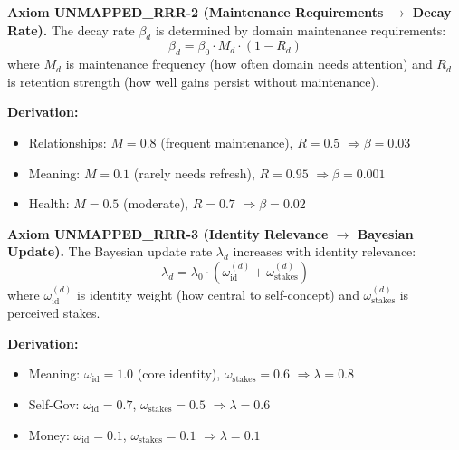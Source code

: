 \begin{tcolorbox}[colback=red!5!white, colframe=red!75!black, title=Axiom UNMAPPED_RRR-2: Maintenance Requirements]
\textbf{Axiom UNMAPPED_RRR-2 (Maintenance Requirements $\rightarrow$ Decay Rate).}
The decay rate $\beta_d$ is determined by domain maintenance requirements:
\begin{equation}
\beta_d = \beta_0 \cdot M_d \cdot (1 - R_d)
\end{equation}
where $M_d$ is maintenance frequency (how often domain needs attention)
and $R_d$ is retention strength (how well gains persist without maintenance).

\textbf{Derivation:}
\begin{itemize}[nosep]
\item Relationships: $M = 0.8$ (frequent maintenance), $R = 0.5$ $\Rightarrow \beta = 0.03$
\item Meaning: $M = 0.1$ (rarely needs refresh), $R = 0.95$ $\Rightarrow \beta = 0.001$
\item Health: $M = 0.5$ (moderate), $R = 0.7$ $\Rightarrow \beta = 0.02$
\end{itemize}
\end{tcolorbox}

\begin{tcolorbox}[colback=red!5!white, colframe=red!75!black, title=Axiom UNMAPPED_RRR-3: Identity Relevance]
\textbf{Axiom UNMAPPED_RRR-3 (Identity Relevance $\rightarrow$ Bayesian Update).}
The Bayesian update rate $\lambda_d$ increases with identity relevance:
\begin{equation}
\lambda_d = \lambda_0 \cdot \left( \omega_{\text{id}}^{(d)} + \omega_{\text{stakes}}^{(d)} \right)
\end{equation}
where $\omega_{\text{id}}^{(d)}$ is identity weight (how central to self-concept)
and $\omega_{\text{stakes}}^{(d)}$ is perceived stakes.

\textbf{Derivation:}
\begin{itemize}[nosep]
\item Meaning: $\omega_{\text{id}} = 1.0$ (core identity), $\omega_{\text{stakes}} = 0.6$ $\Rightarrow \lambda = 0.8$
\item Self-Gov: $\omega_{\text{id}} = 0.7$, $\omega_{\text{stakes}} = 0.5$ $\Rightarrow \lambda = 0.6$
\item Money: $\omega_{\text{id}} = 0.1$, $\omega_{\text{stakes}} = 0.1$ $\Rightarrow \lambda = 0.1$
\end{itemize}
\end{tcolorbox}

